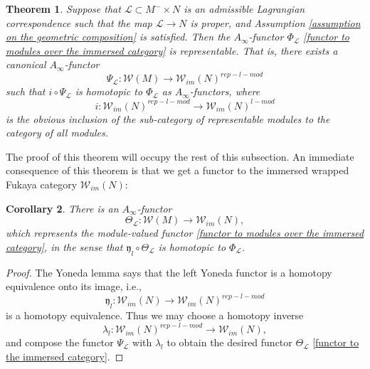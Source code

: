 \documentclass{amsart}
\newtheorem{theorem}{Theorem}[section]
\newtheorem{corollary}[theorem]{Corollary}
\numberwithin{equation}{section}
\numberwithin{figure}{section}
\begin{document}
\begin{theorem} \label{representability of Lagrangian correspondence functor}
	Suppose that $\mathcal{L} \subset M^{-} \times N$ is an admissible Lagrangian correspondence such that the map $\mathcal{L} \to N$ is proper, and Assumption \ref{assumption on the geometric composition} is satisfied.
Then the $A_{\infty}$-functor $\Phi_{\mathcal{L}}$ \eqref{functor to modules over the immersed category} is representable. That is, there exists a canonical $A_{\infty}$-functor
\begin{equation}\label{the new module-valued functor}
\Psi_{\mathcal{L}}: \mathcal{W}(M) \to \mathcal{W}_{im}(N)^{rep-l-mod}
\end{equation}
such that $i \circ \Psi_{\mathcal{L}}$ is  homotopic to $\Phi_{\mathcal{L}}$ as $A_{\infty}$-functors, where
\begin{equation*}
i: \mathcal{W}_{im}(N)^{rep-l-mod} \to \mathcal{W}_{im}(N)^{l-mod}
\end{equation*}
is the obvious inclusion of the sub-category of representable modules to the category of all modules.
\end{theorem}

	The proof of this theorem will occupy the rest of this subsection. An immediate consequence of this theorem is that we get a functor to the immersed wrapped Fukaya category $\mathcal{W}_{im}(N)$: \par

\begin{corollary}
	There is an $A_{\infty}$-functor
\begin{equation}\label{functor to the immersed category}
\Theta_{\mathcal{L}}: \mathcal{W}(M) \to \mathcal{W}_{im}(N),
\end{equation}
which represents the module-valued functor \eqref{functor to modules over the immersed category}, in the sense that $\mathfrak{y}_{l} \circ \Theta_{\mathcal{L}}$ is homotopic to $\Phi_{\mathcal{L}}$.
\end{corollary}
\begin{proof}
	The Yoneda lemma says that the left Yoneda functor is a homotopy equivalence onto its image, i.e.,
\begin{equation*}
\mathfrak{y}_{l}: \mathcal{W}_{im}(N) \to \mathcal{W}_{im}(N)^{rep-l-mod}
\end{equation*}
is a homotopy equivalence.
Thus we may choose a homotopy inverse
\begin{equation*}
\lambda_{l}: \mathcal{W}_{im}(N)^{rep-l-mod} \to \mathcal{W}_{im}(N),
\end{equation*}
and compose the functor $\Psi_{\mathcal{L}}$ with $\lambda_{l}$ to obtain the desired functor $\Theta_{\mathcal{L}}$ \eqref{functor to the immersed category}. \par
\end{proof}
\end{document}
